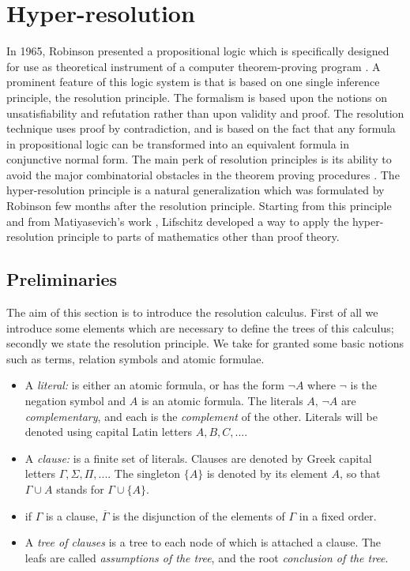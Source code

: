 \documentclass[a4paper,12pt,oneside]{book}
\begin{document}
\chapter{Hyper-resolution}
In 1965, Robinson presented a propositional logic which is specifically designed for use as theoretical instrument of a computer theorem-proving program \cite{robinson}. A prominent feature of this logic system is that is based on one single inference principle, the resolution principle. 
The formalism is based upon the notions on unsatisfiability and refutation rather than upon validity and proof. The resolution technique uses proof by contradiction, and is based on the fact that any formula in propositional logic can be transformed into an equivalent formula in conjunctive normal form. 
The main perk of resolution principles is its ability to avoid the major combinatorial obstacles in the theorem proving procedures  \cite{robinson}.
The hyper-resolution principle is a natural generalization which was formulated by Robinson \cite{rob,robinson-general} few months after the resolution principle. Starting from this principle and from Matiyasevich's work \cite{mat-1}, Lifschitz \cite{lifschitz} developed a way to apply the hyper-resolution principle to parts of mathematics other than proof theory.

\newpage
\section{Preliminaries}
The aim of this section is to introduce the resolution calculus. First of all we introduce some elements which are necessary to define the trees of this calculus; secondly we state the resolution principle. We take for granted some basic notions such as terms, relation symbols and atomic formulae. 
\begin{itemize}
\item A \textit{literal:} is either an atomic formula, or has the form $\neg A$ where $\neg$ is the negation symbol and $A$ is an atomic formula. The literals $A,\,\neg A$ are \textit{complementary}, and each is the \textit{complement} of the other. Literals will be denoted using capital Latin letters $A,B,C,...$.
\item A \textit{clause:} is a finite set of literals. Clauses are denoted by Greek capital letters $\Gamma,\Sigma ,\Pi,...$. The singleton $\{A\}$ is denoted by its element $A$, so that $\Gamma\cup A$ stands for $\Gamma\cup\{A\}$.
\item if $\Gamma$ is a clause, $\overline{\Gamma}$ is the disjunction of the elements of $\Gamma$ in a fixed order.
\item A \textit{tree of clauses} is a tree to each node of which is attached a clause. The leafs are called \textit{assumptions of the tree}, and the root \textit{conclusion of the tree}.
\end{itemize}
\end{document}
